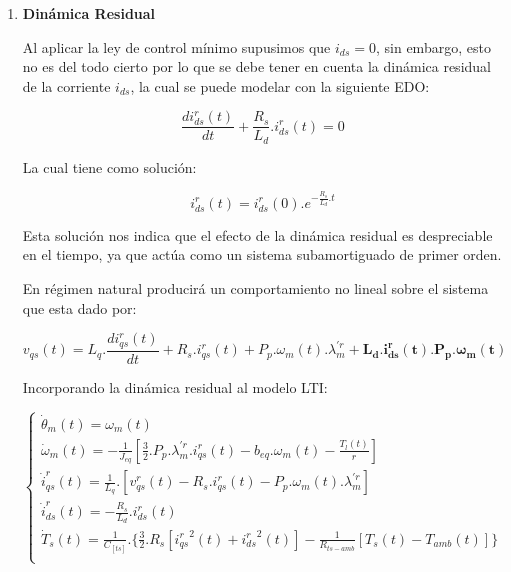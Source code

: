 \documentclass{article}
\begin{document}
\begin{enumerate}[label=\roman*.]
    \item \textbf{Dinámica Residual}
    
    Al aplicar la ley de control mínimo supusimos que $i_{ds} = 0$, sin embargo, esto no es del todo cierto
    por lo que se debe tener en cuenta la dinámica residual de la corriente $i_{ds}$, la cual se puede
    modelar con la siguiente EDO:

    \begin{equation}
        \frac{di_{ds}^r(t)}{dt} + \frac{R_{s}}{L_{d}}.i_{ds}^r(t) = 0 
    \end{equation} 

    La cual tiene como solución:

    \begin{equation}
        i_{ds}^r(t) = i_{ds}^r(0).e^{-\frac{R_{s}}{L_{d}}.t}
    \end{equation}

    Esta solución nos indica que el efecto de la dinámica residual es despreciable en el tiempo, ya que actúa como
    un sistema subamortiguado de primer orden.

    En régimen natural producirá un comportamiento no lineal sobre el sistema que esta dado por:

    \begin{equation}\label{eq.dinamica_residual}
        v_{qs}(t) = L_{q}.\frac{di_{qs}^r(t)}{dt} + R_{s}.i_{qs}^r(t) + P_{p}.\omega_{m}(t).\lambda_{m}^{\prime r} + \mathbf{L_{d}.i_{ds}^r(t).P_{p}.\omega_{m}(t)}
    \end{equation}

    Incorporando la dinámica residual al modelo LTI:    

    \begin{equation}
        \begin{cases}
            \dot{\theta}_{m}(t) = \omega_{m}(t)\\
            \dot{\omega}_{m}(t) = -\frac{1}{J_{eq}}[\frac{3}{2}.P_{p}.\lambda_{m}^{\prime r} .i_{qs}^r(t) - b_{eq}.\omega_{m}(t)-\frac{T_{l}(t)}{r}]\\
            \dot{i}_{qs}^r(t) = \frac{1}{L_{q}}.[v_{qs}^r(t) - R_{s}.i_{qs}^r(t) - P_{p}.\omega_{m}(t).\lambda_{m}^{\prime r}]\\
            \dot{i}_{ds}^r(t) = -\frac{R_{s}}{L_{d}}.i_{ds}^r(t) \\
            \dot{T}_{s}(t) = \frac{1}{C_[ts]}.\{\frac{3}{2}.R_{s}[{i_{qs}^r}^2(t) + {i_{ds}^r}^2(t)] - \frac{1}{R_{ts-amb}}[T_{s}(t) - T_{amb}(t)]\}\\
        \end{cases}    
    \end{equation}


\end{enumerate}
\end{document}
